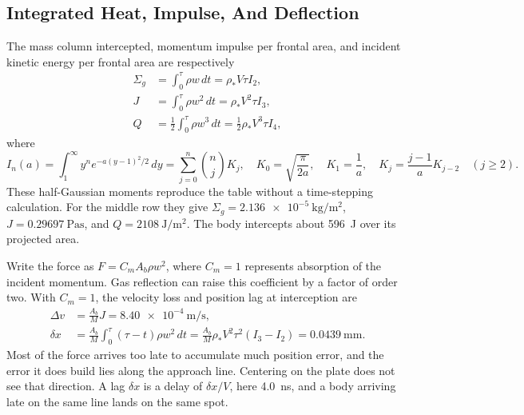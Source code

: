 \documentclass{article}
\newcommand{\deltav}{\Delta v}
\begin{document}
\subsection{Integrated Heat, Impulse, And Deflection}
The mass column intercepted, momentum impulse per frontal area, and incident kinetic energy per frontal area are respectively
\begin{align}\label{eq:leo_plume_integrals}
\Sigma_g&=\int_0^\tau\rho w\,dt=\rho_*V\tau I_2,\\
J&=\int_0^\tau\rho w^2\,dt=\rho_*V^2\tau I_3,\\
Q&=\tfrac12\int_0^\tau\rho w^3\,dt=\tfrac12\rho_*V^3\tau I_4,
\end{align}
where
\begin{equation}
I_n(a)=\int_1^\infty y^n e^{-a(y-1)^2/2}\,dy
=\sum_{j=0}^n {n\choose j}K_j,
\quad
K_0=\sqrt{\frac{\pi}{2a}},\quad K_1=\frac1a,\quad
K_j=\frac{j-1}{a}K_{j-2}\quad(j\geq2).
\end{equation}
These half-Gaussian moments reproduce the table without a time-stepping calculation. For the middle row they give $\Sigma_g=\SI{2.136e-5}{\kilogram\per\square\meter}$, $J=\SI{0.29697}{\pascal\second}$, and $Q=\SI{2108}{\joule\per\square\meter}$. The body intercepts about \SI{596}{\joule} over its projected area.

Write the force as $F=C_mA_b\rho w^2$, where $C_m=1$ represents absorption of the incident momentum. Gas reflection can raise this coefficient by a factor of order two. With $C_m=1$, the velocity loss and position lag at interception are
\begin{align}
\deltav&=\frac{A_b}{M}J=\SI{8.40e-4}{\meter\per\second},\\
\delta x&=\frac{A_b}{M}\int_0^\tau(\tau-t)\rho w^2\,dt
=\frac{A_b}{M}\rho_*V^2\tau^2(I_3-I_2)
=\SI{0.0439}{\milli\meter}.\label{eq:leo_plume_displacement}
\end{align}
Most of the force arrives too late to accumulate much position error, and the error it does build lies along the approach line. Centering on the plate does not see that direction. A lag $\delta x$ is a delay of $\delta x/V$, here \SI{4.0}{\nano\second}, and a body arriving late on the same line lands on the same spot.
\end{document}
